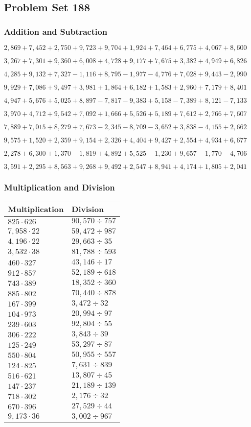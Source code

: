 \hypertarget{problem-set-188}{%
\subsection{Problem Set 188}\label{problem-set-188}}

\hypertarget{addition-and-subtraction}{%
\subsubsection{Addition and
Subtraction}\label{addition-and-subtraction}}

\(2,869+7,452+2,750+9,723+9,704+1,924+7,464+6,775+4,067+8,600\)

\(3,267+7,301+9,360+6,008+4,728+9,177+7,675+3,382+4,949+6,826\)

\(4,285+9,132+7,327-1,116+8,795-1,977-4,776+7,028+9,443-2,990\)

\(9,929+7,086+9,497+3,981+1,864+6,182+1,583+2,960+7,179+8,401\)

\(4,947+5,676+5,025+8,897-7,817-9,383+5,158-7,389+8,121-7,133\)

\(3,970+4,712+9,542+7,092+1,666+5,526+5,189+7,612+2,766+7,607\)

\(7,889+7,015+8,279+7,673-2,345-8,709-3,652+3,838-4,155+2,662\)

\(9,575+1,520+2,359+9,154+2,326+4,404+9,427+2,554+4,934+6,677\)

\(2,278+6,300+1,370-1,819+4,892+5,525-1,230+9,657-1,770-4,706\)

\(3,591+2,295+8,563+9,268+9,492+2,547+8,941+4,174+1,805+2,041\)

\hypertarget{multiplication-and-division}{%
\subsubsection{Multiplication and
Division}\label{multiplication-and-division}}

\begin{longtable}[]{@{}ll@{}}
\toprule
Multiplication & Division\tabularnewline
\midrule
\endhead
\(825\cdot626\) & \(90,570÷757\)\tabularnewline
\(7,958\cdot22\) & \(59,472÷987\)\tabularnewline
\(4,196\cdot22\) & \(29,663÷35\)\tabularnewline
\(3,532\cdot38\) & \(81,788÷593\)\tabularnewline
\(460\cdot327\) & \(43,146÷17\)\tabularnewline
\(912\cdot857\) & \(52,189÷618\)\tabularnewline
\(743\cdot389\) & \(18,352÷360\)\tabularnewline
\(885\cdot802\) & \(70,440÷878\)\tabularnewline
\(167\cdot399\) & \(3,472÷32\)\tabularnewline
\(104\cdot973\) & \(20,994÷97\)\tabularnewline
\(239\cdot603\) & \(92,804÷55\)\tabularnewline
\(306\cdot222\) & \(3,843÷39\)\tabularnewline
\(125\cdot249\) & \(53,297÷87\)\tabularnewline
\(550\cdot804\) & \(50,955÷557\)\tabularnewline
\(124\cdot825\) & \(7,631÷839\)\tabularnewline
\(516\cdot621\) & \(13,807÷45\)\tabularnewline
\(147\cdot237\) & \(21,189÷139\)\tabularnewline
\(718\cdot302\) & \(2,176÷32\)\tabularnewline
\(670\cdot396\) & \(27,529÷44\)\tabularnewline
\(9,173\cdot36\) & \(3,002÷967\)\tabularnewline
\bottomrule
\end{longtable}
